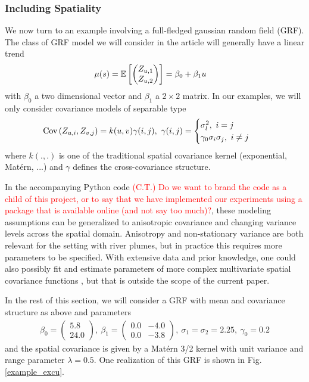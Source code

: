 \documentclass[aoas]{imsart}
\begin{document}
\subsubsection{Including Spatiality}
We now turn to an example involving a full-fledged gaussian random field (GRF). The class of GRF model we will consider in the article will generally have a linear trend
\begin{align*}
\mu(s)=\mathbb{E}\left[\begin{pmatrix}
Z_{\spatloc, 1}\\ Z_{\spatloc, 2}
\end{pmatrix}\right] &= \beta_0 + \beta_1 \spatloc
\end{align*}
with $\beta_0$ a two dimensional vector and $\beta_1$ a $2\times 2$ matrix. In our examples, we will only consider covariance models of separable type
\begin{align*}
\textrm{Cov}\left(Z_{\spatloc, i}, Z_{v, j}\right) &= k(\spatloc, v) \gamma(i, j),~ \gamma(i, j) = \begin{cases} \sigma_l^2,~ i=j\\
   \gamma_0 \sigma_i \sigma_j,~i\neq j
        \end{cases}
\end{align*}
where $k(., .)$ is one of the traditional spatial covariance kernel (exponential, Mat\'{e}rn, ...) and $\gamma$ defines the cross-covariance structure.

In the accompanying Python code \textcolor{red}{(C.T.) Do we want to brand the code as a child of this project, or to say that we have implemented our experiments using a package that is available online (and not say too much)?}, these modeling assumptions can be
generalized to anisotropic covariance and changing variance levels
across the spatial domain. Anisotropy and
non-stationary variance are both relevant for the setting with river
plumes, but in practice this requires more parameters to be
specified. With extensive data and prior knowledge, one could also
possibly fit and estimate parameters of more complex multivariate
spatial covariance functions
\citep{gneiting2010matern,genton2015cross}, but that is outside the
scope of the current paper.

In the rest of this section, we will consider a GRF with mean and covariance structure as above and parameters
\begin{align*}
\beta_0 = \begin{pmatrix}
5.8\\ 24.0
\end{pmatrix}, ~ \beta_1 = \begin{pmatrix}
0.0 & -4.0\\
0.0 & -3.8
\end{pmatrix},~ \sigma_1 = \sigma_2 = 2.25, ~ \gamma_0 = 0.2
\end{align*}
and the spatial covariance is given by a Mat\'{e}rn 3/2 kernel with unit variance and range parameter $\lambda=0.5$.
One realization of this GRF is shown in Fig. \ref{example_excu}.
\end{document}
